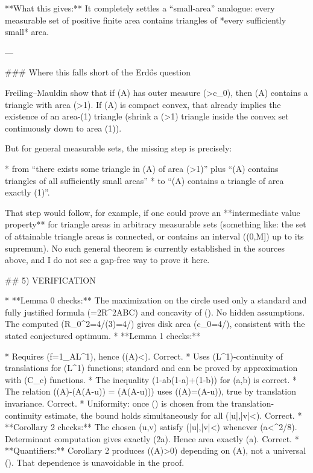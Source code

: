 **What this gives:** It completely settles a “small-area” analogue: every measurable set of positive finite area contains triangles of *every sufficiently small* area.

---

### Where this falls short of the Erdős question

Freiling–Mauldin show that if (A) has outer measure (>c_0), then (A) contains a triangle with area (>1).
If (A) is compact convex, that already implies the existence of an area-(1) triangle (shrink a (>1) triangle inside the convex set continuously down to area (1)).

But for general measurable sets, the missing step is precisely:

* from “there exists some triangle in (A) of area (>1)” plus “(A) contains triangles of all sufficiently small areas”
* to “(A) contains a triangle of area exactly (1)”.

That step would follow, for example, if one could prove an **intermediate value property** for triangle areas in arbitrary measurable sets (something like: the set of attainable triangle areas is connected, or contains an interval ((0,M]) up to its supremum). No such general theorem is currently established in the sources above, and I do not see a gap-free way to prove it here.

## 5) VERIFICATION

* **Lemma 0 checks:** The maximization on the circle used only a standard and fully justified formula (=2R^2\sin A\sin B\sin C) and concavity of (\log\sin). No hidden assumptions. The computed (R_0^2=4/(3)=4/) gives disk area (c_0=4\pi/), consistent with the stated conjectured optimum.
* **Lemma 1 checks:**

  * Requires (f=1_A\in L^1), hence (\mu(A)<\infty). Correct.
  * Uses (L^1)-continuity of translations for (L^1) functions; standard and can be proved by approximation with (C_c) functions.
  * The inequality (1-ab\le (1-a)+(1-b)) for (a,b\in[0,1]) is correct.
  * The relation (\mu(A)-\mu(A\cap(A-u)) = \mu(A\triangle(A-u))) uses (\mu(A)=\mu(A-u)), true by translation invariance. Correct.
  * Uniformity: once (\rho) is chosen from the translation-continuity estimate, the bound holds simultaneously for all (|u|,|v|<\rho). Correct.
* **Corollary 2 checks:** The chosen (u,v) satisfy (|u|,|v|<\rho) whenever (a<\rho^2/8). Determinant computation gives exactly (2a). Hence area exactly (a). Correct.
* **Quantifiers:** Corollary 2 produces (\varepsilon(A)>0) depending on (A), not a universal (\varepsilon). That dependence is unavoidable in the proof.

